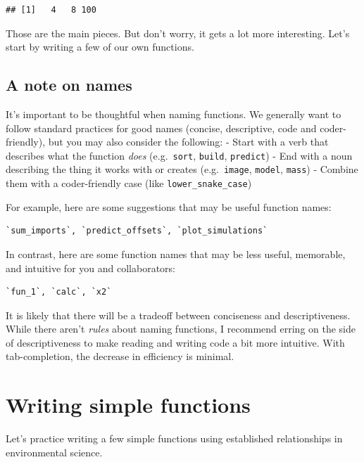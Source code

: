 \documentclass[
]{book}
\begin{document}
\begin{verbatim}
## [1]   4   8 100
\end{verbatim}

Those are the main pieces. But don't worry, it gets a lot more interesting. Let's start by writing a few of our own functions.

\hypertarget{a-note-on-names}{%
\subsection{A note on names}\label{a-note-on-names}}

It's important to be thoughtful when naming functions. We generally want to follow standard practices for good names (concise, descriptive, code and coder-friendly), but you may also consider the following:
- Start with a verb that describes what the function \emph{does} (e.g.~\texttt{sort}, \texttt{build}, \texttt{predict})
- End with a noun describing the thing it works with or creates (e.g.~\texttt{image}, \texttt{model}, \texttt{mass})
- Combine them with a coder-friendly case (like \texttt{lower\_snake\_case})

For example, here are some suggestions that may be useful function names:

\begin{verbatim}
`sum_imports`, `predict_offsets`, `plot_simulations`
\end{verbatim}

In contrast, here are some function names that may be less useful, memorable, and intuitive for you and collaborators:

\begin{verbatim}
`fun_1`, `calc`, `x2`
\end{verbatim}

It is likely that there will be a tradeoff between conciseness and descriptiveness. While there aren't \emph{rules} about naming functions, I recommend erring on the side of descriptiveness to make reading and writing code a bit more intuitive. With tab-completion, the decrease in efficiency is minimal.

\hypertarget{writing-simple-functions}{%
\section{Writing simple functions}\label{writing-simple-functions}}

Let's practice writing a few simple functions using established relationships in environmental science.
\end{document}
